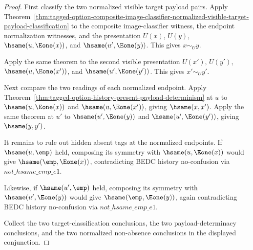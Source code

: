 \begin{proof}
First classify the two normalized visible target payload pairs. Apply
Theorem~\ref{thm:tagged-option-composite-image-classifier-normalized-visible-target-payload-classification}
to the composite image-classifier witness, the endpoint normalization witnesses,
and the presentation $U(x)$, $U(y)$, $\hsame(u,\Eone(x))$, and
$\hsame(u',\Eone(y))$. This gives $x\sim_U y$.

Apply the same theorem to the second visible presentation
$U(x')$, $U(y')$, $\hsame(u,\Eone(x'))$, and
$\hsame(u',\Eone(y'))$. This gives $x'\sim_U y'$.

Next compare the two readings of each normalized endpoint. Apply
Theorem~\ref{thm:tagged-option-history-present-payload-determinism} at $u$ to
$\hsame(u,\Eone(x))$ and $\hsame(u,\Eone(x'))$, giving $\hsame(x,x')$.
Apply the same theorem at $u'$ to $\hsame(u',\Eone(y))$ and
$\hsame(u',\Eone(y'))$, giving $\hsame(y,y')$.

It remains to rule out hidden absent tags at the normalized endpoints. If
$\hsame(u,\emp)$ held, composing its symmetry with $\hsame(u,\Eone(x))$ would
give $\hsame(\emp,\Eone(x))$, contradicting BEDC history no-confusion via
$not\_hsame\_emp\_e1$.

Likewise, if $\hsame(u',\emp)$ held, composing its symmetry with
$\hsame(u',\Eone(y))$ would give $\hsame(\emp,\Eone(y))$, again contradicting
BEDC history no-confusion via $not\_hsame\_emp\_e1$.

Collect the two target-classification conclusions, the two payload-determinacy
conclusions, and the two normalized non-absence conclusions in the displayed
conjunction.
\end{proof}

